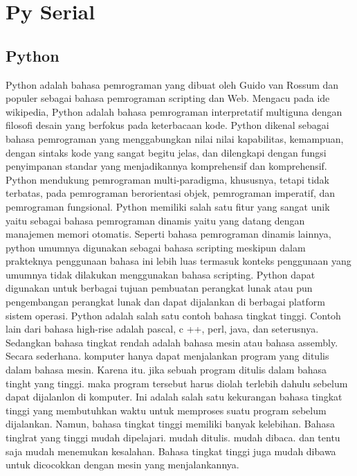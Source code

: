 \section{Py Serial}

	\subsection{Python}
	Python adalah bahasa pemrograman yang dibuat oleh Guido van Rossum dan populer sebagai bahasa pemrograman scripting dan Web. Mengacu pada ide wikipedia, Python adalah bahasa pemrograman interpretatif multiguna dengan filosofi desain yang berfokus pada keterbacaan kode. 
	Python dikenal sebagai bahasa pemrograman yang menggabungkan nilai nilai kapabilitas, kemampuan, dengan sintaks kode yang sangat begitu jelas, dan dilengkapi dengan fungsi penyimpanan standar yang menjadikannya komprehensif dan komprehensif. 
	Python mendukung pemrograman multi-paradigma, khususnya, tetapi tidak terbatas, pada pemrograman berorientasi objek, pemrograman imperatif, dan pemrograman fungsional. 
	Python memiliki salah satu fitur yang sangat unik yaitu sebagai bahasa pemrograman dinamis yaitu yang datang dengan manajemen memori otomatis. Seperti bahasa 
	pemrograman dinamis lainnya, python umumnya digunakan sebagai bahasa scripting meskipun dalam prakteknya penggunaan bahasa ini lebih luas termasuk konteks penggunaan yang umumnya tidak dilakukan menggunakan bahasa scripting. 
	Python dapat digunakan untuk berbagai tujuan pembuatan perangkat lunak atau pun pengembangan perangkat lunak dan dapat dijalankan di berbagai platform sistem operasi. Python adalah salah satu contoh bahasa tingkat tinggi. 
	Contoh lain dari bahasa high-rise adalah pascal, c ++, perl, java, dan seterusnya. Sedangkan bahasa tingkat rendah adalah bahasa mesin atau bahasa assembly. 
	Secara sederhana. komputer hanya dapat menjalankan program yang ditulis dalam bahasa mesin. Karena itu. jika sebuah program ditulis dalam bahasa tinght yang tinggi. maka program tersebut harus diolah terlebih dahulu sebelum dapat dijalanlon di komputer. 
	Ini adalah salah satu kekurangan bahasa tingkat tinggi yang membutuhkan waktu untuk memproses suatu program sebelum dijalankan. Namun, bahasa tingkat tinggi memiliki banyak kelebihan. Bahasa tinglrat yang tinggi mudah dipelajari. mudah ditulis. mudah dibaca. dan tentu saja mudah menemukan kesalahan. Bahasa tingkat tinggi juga mudah dibawa untuk dicocokkan dengan mesin yang menjalankannya. 
